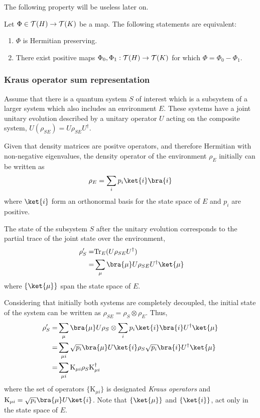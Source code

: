 The following property will be useless later on.

\begin{theorem} \cite[Theorem 2.25]{watrous2018theory} \label{thm:sub_pos_hem-pres}
  Let \(\Phi \in \mathcal{T}(H) \to \mathcal{T}(K)\) be a map. The following statements are equivalent:
\begin{enumerate}
    \item \(\Phi\) is Hermitian preserving.
    \item There exist positive maps \(\Phi_0, \Phi_1:  \mathcal{T}(H) \to \mathcal{T}(K)\) for which
    \(
        \Phi = \Phi_0 - \Phi_1.
    \)
\end{enumerate}
\end{theorem}




\subsubsection{Kraus operator sum representation}


Assume that there is a quantum system $S$ of interest which is a subsystem of a larger system which also includes an environment $E$. These systems have a joint unitary evolution described by a unitary operator $U$ acting on the composite system, $U (\rho_{SE} )= U \rho_{SE} U^{\dag}$. 

Given that density matrices are positve operators, and therefore Hermitian with non-negative eigenvalues, the density operator of the environment $\rho_E$ initially can be written as 
\begin{equation*}
  \rho_E = \sum_{i} p_{i} \ket{i} \bra{i}
\end{equation*}
where $\ket{i}$ form an orthonormal basis for the state space of $E$ and $p_{i}$ are positive. 

The state of the subsystem $S$ after the unitary evolution corresponds to the partial trace of the joint state over the environment,
\begin{align*}
  \rho_{S}' = & \text{Tr}_{E}(U \rho_{SE} U^{\dag}) \\
 = & \sum_{\mu} \bra{\mu} U \rho_{SE} U^{\dag} \ket{\mu}
\end{align*}
where $\{\ket{\mu}\}$ span the state space of $E$.

 
Considering that initially both systems are completely decoupled, the initial state of the system can be written as $ \rho_{SE} = \rho_{S} \otimes \rho_{E}$. Thus,
\begin{align*} 
  \rho_{S}' = & \sum_{\mu} \bra{\mu} U \rho_{S} \otimes \sum_{i} p_{i} \ket{i} \bra{i} U^{\dag} \ket{\mu} \\
  = & \sum_{\mu i}  \sqrt{p_{i}} \bra{\mu} U \ket{i} \rho_{S} \sqrt{p_{i}} \bra{i} U^{\dag} \ket{\mu}  \\ 
  = & \sum_{\mu i} \text{K}_{\mu i} \rho_{S} \text{K}_{\mu i}^{\dag}
\end{align*}
where the set of operators $\{\text{K}_{\mu i}\}$ is designated \emph{Kraus operators} and $\text{K}_{\mu i} = \sqrt{p_{i}} \bra{\mu} U \ket{i}$. Note that $\{\ket{\mu}\}$ and $\{\ket{i}\}$, act only in the state space of $E$. 

